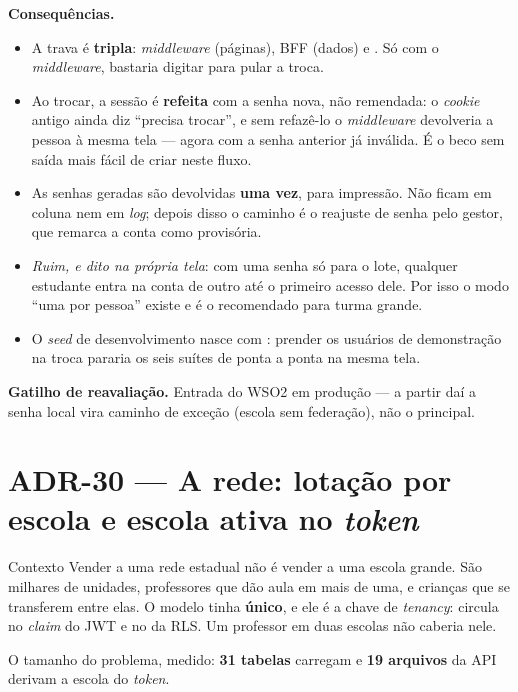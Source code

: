 \textbf{Consequências.}
\begin{itemize}
  \item A trava é \textbf{tripla}: \emph{middleware} (páginas), BFF (dados) e
    . Só com o \emph{middleware}, bastaria digitar
     para pular a troca.
  \item Ao trocar, a sessão é \textbf{refeita} com a senha nova, não remendada:
    o \emph{cookie} antigo ainda diz \enquote{precisa trocar}, e sem refazê-lo o
    \emph{middleware} devolveria a pessoa à mesma tela --- agora com a senha
    anterior já inválida. É o beco sem saída mais fácil de criar neste fluxo.
  \item As senhas geradas são devolvidas \textbf{uma vez}, para impressão. Não
    ficam em coluna nem em \emph{log}; depois disso o caminho é o reajuste de
    senha pelo gestor, que remarca a conta como provisória.
  \item \emph{Ruim, e dito na própria tela}: com uma senha só para o lote,
    qualquer estudante entra na conta de outro até o primeiro acesso dele. Por isso o
    modo \enquote{uma por pessoa} existe e é o recomendado para turma grande.
  \item O \emph{seed} de desenvolvimento nasce com :
    prender os usuários de demonstração na troca pararia os seis
    suítes de ponta a ponta na mesma tela.
\end{itemize}

\textbf{Gatilho de reavaliação.} Entrada do WSO2 em produção --- a partir daí a
senha local vira caminho de exceção (escola sem federação), não o principal.

\section{ADR-30 --- A rede: lotação por escola e escola ativa no \emph{token}}
\label{adr:rede-lotacoes}

\begin{especificacao}{Contexto}
Vender a uma rede estadual não é vender a uma escola grande. São milhares de
unidades, professores que dão aula em mais de uma, e crianças que se transferem
entre elas. O modelo tinha  \textbf{único}, e ele é a chave
de \emph{tenancy}: circula no \emph{claim}  do JWT e no
 da RLS. Um professor em duas escolas não caberia nele.

O tamanho do problema, medido: \textbf{31 tabelas} carregam  e
\textbf{19 arquivos} da API derivam a escola do \emph{token}.
\end{especificacao}

